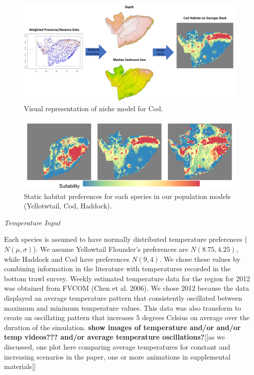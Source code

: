 \documentclass[
  12pt,
]{article}
\begin{document}
\begin{figure}

{\centering \includegraphics[width=0.95\linewidth]{Images/hab_snip3} 

}

\caption{Visual representation of niche model for Cod.}\label{fig:hab-plot1}
\end{figure}

\begin{figure}

{\centering \includegraphics[width=0.95\linewidth]{Images/Habitat_3species} 

}

\caption{Static habitat preferences for each species in our population models (Yellotwtail, Cod, Haddock).}\label{fig:hab-plot}
\end{figure}

\emph{Temperature Input}

Each species is assumed to have normally distributed temperature preferences (\(N(\mu,\sigma)\)). We assume Yellowtail Flounder's preferences are \(N(8.75,4.25)\), while Haddock and Cod have preferences \(N(9,4)\). We chose these values by combining information in the literature with temperatures recorded in the bottom trawl survey. Weekly estimated temperature data for the region for 2012 was obtained from FVCOM (Chen et al. 2006). We chose 2012 because the data displayed an average temperature pattern that consistently oscillated between maximum and minimum temperature values. This data was also transform to create an oscillating pattern that increases 5 degrees Celsius on average over the duration of the simulation. \textbf{show images of temperature and/or and/or temp videos??? and/or average temperature oscillations?}{[}{[}as we discussed, one plot here comparing average temperatures for constant and increasing scenarios in the paper, one or more animations in supplemental materials{]}{]}
\end{document}
